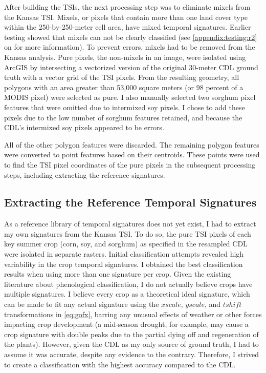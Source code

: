 After building the TSIs, the next processing step was to eliminate mixels from the Kansas TSI. Mixels, or pixels that contain more than one land cover type within the 250-by-250-meter cell area, have mixed temporal signatures. Earlier testing showed that mixels can not be clearly classified (see \autoref{appendix:testing:r2} on  for more information). To prevent errors, mixels had to be removed from the Kansas analysis. Pure pixels, the non-mixels in an image, were isolated using ArcGIS \autocite{arcgis10.1} by intersecting a vectorized version of the original 30-meter CDL ground truth with a vector grid of the TSI pixels. From the resulting geometry, all polygons with an area greater than 53,000 square meters (or 98 percent of a MODIS pixel) were selected as pure. I also manually selected two sorghum pixel features that were omitted due to intermixed soy pixels. I chose to add these pixels due to the low number of sorghum features retained, and because the CDL's intermixed soy pixels appeared to be errors.

All of the other polygon features were discarded. The remaining polygon features were converted to point features based on their centroids. These points were used to find the TSI pixel coordinates of the pure pixels in the subsequent processing steps, including extracting the reference signatures. 

\subsection{Extracting the Reference Temporal Signatures}
\label{methods:sigextraction}

As a reference library of temporal signatures does not yet exist, I had to extract my own signatures from the Kansas TSI. To do so, the pure TSI pixels of each key summer crop (corn, soy, and sorghum) as specified in the resampled CDL were isolated in separate rasters. Initial classification attempts revealed high variability in the crop temporal signatures. I obtained the best classification results when using more than one signature per crop. Given the existing literature about phenological classification, I do not actually believe crops have multiple signatures. I believe every crop as a theoretical ideal signature, which can be made to fit any actual signature using the $xscale$, $yscale$, and $tshift$ transformations in \autoref{eq:gofx}, barring any unusual effects of weather or other forces impacting crop development (a mid-season drought, for example, may cause a crop signature with double peaks due to the partial dying off and regeneration of the plants). However, given the CDL as my only source of ground truth, I had to assume it was accurate, despite any evidence to the contrary. Therefore, I strived to create a classification with the highest accuracy compared to the CDL.

